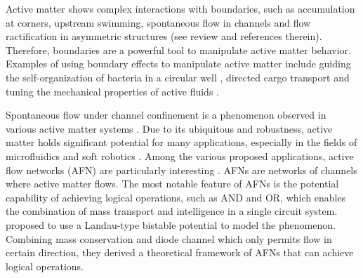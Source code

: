 \documentclass[%
10pt,
superscriptaddress,
twocolumn,
 amsmath,amssymb,
 aps,prx,
]{revtex4-2}
\begin{document}
Active matter shows complex interactions with boundaries, such as accumulation at corners, upstream swimming, spontaneous flow in channels and flow ractification in asymmetric structures (see review \cite{Bechinger2016} and references therein).
Therefore, boundaries are a powerful tool to manipulate active matter behavior.
Examples of using boundary effects to manipulate active matter include guiding the self-organization of bacteria in a circular well \cite{Lushi2014, Wioland2016}, directed cargo transport \cite{Ghosh2020} and tuning the mechanical properties of active fluids \cite{Saintillan2018, Liu2019}.

Spontaneous flow under channel confinement is a phenomenon observed in various active matter systems \cite{Lushi2014,Wioland2016,Wu2017,Duclos2017,Morin2018,Hardouin2020}.
Due to its ubiquitous and robustness, active matter holds significant potential for many applications, especially in the fields of microfluidics and soft robotics \cite{Hardouin2020,}.
Among the various proposed applications, active flow networks (AFN) are particularly interesting \cite{Woodhouse2016,Woodhouse2017}.
AFNs are networks of channels where active matter flows.
The most notable feature of AFNs is the potential capability of achieving logical operations, such as AND and OR, which enables the combination of mass transport and intelligence in a single circuit system. 
\citet{Woodhouse2017} proposed to use a Landau-type bistable potential to model the phenomenon. 
Combining mass conservation and diode channel which only permits flow in certain direction, they derived a theoretical framework of AFNs that can achieve logical operations.
\end{document}
